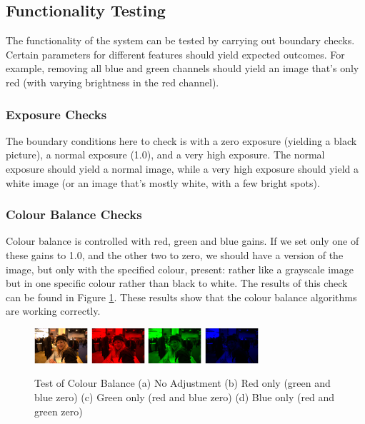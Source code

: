 \documentclass[10pt,a4paper]{article}
\begin{document}
\subsection{Functionality Testing}
The functionality of the system can be tested by carrying out boundary checks. Certain parameters for different features should yield 
expected outcomes. For example, removing all blue and green channels should yield an image that's only red (with varying brightness in the red channel).

\subsubsection{Exposure Checks}
The boundary conditions here to check is with a zero exposure (yielding a black picture), a normal exposure (1.0), and a very high exposure.
The normal exposure should yield a normal image, while a very high exposure should yield a white image (or an image that's mostly white, with a few
bright spots).


\subsubsection{Colour Balance Checks}
Colour balance is controlled with red, green and blue gains. If we set only one of these gains to 1.0, and the other two to zero, we should
have a version of the image, but only with the specified colour, present: rather like a grayscale image but in one specific colour rather than black to white.
The results of this check can be found in Figure \ref{colourbalancetest}. These results show that the colour balance algorithms are working correctly.
\begin{figure}\label{colourbalancetest}
    \centering
    \subfigure
    {
        \includegraphics[width=75px]{colourtest_no_adjustment}
    }
    \subfigure
    {
        \includegraphics[width=75px]{colourtest_redonly}
    }
    \subfigure
    {
        \includegraphics[width=75px]{colourtest_greenonly}
    }
    \subfigure
    {
        \includegraphics[width=75px]{blueonly}
    }
    \caption{
        Test of Colour Balance 
        (a) No Adjustment
        (b) Red only (green and blue zero)
        (c) Green only (red and blue zero)
        (d) Blue only (red and green zero)
    }
 \end{figure}
\end{document}
